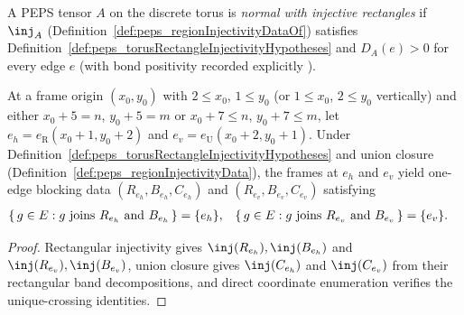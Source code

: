 \begin{definition}%
    \label{def:peps_normalTorusRectanglePEPS}
    \leanok
    A PEPS tensor $A$ on the discrete torus is \emph{normal with injective
        rectangles} if $\inj_A$ (Definition~\ref{def:peps_regionInjectivityDataOf})
    satisfies Definition~\ref{def:peps_torusRectangleInjectivityHypotheses} and
    $D_A(e)>0$ for every edge $e$ \cite[Theorem~3]{Molnar2018NormalPEPS}
    (with bond positivity recorded explicitly
    \cite{gap:peps_injective_ft_section3_route}).
\end{definition}

\begin{lemma}%
    \label{lem:peps_torusRectangleReferenceBlockingData}
    \leanok
    At a frame origin $(x_0,y_0)$ with $2\le x_0$, $1\le y_0$ (or $1\le x_0$,
    $2\le y_0$ vertically) and either $x_0+5=n$, $y_0+5=m$ or $x_0+7\le n$,
    $y_0+7\le m$, let $e_h=e_{\mathrm R}(x_0+1,y_0+2)$ and
    $e_v=e_{\mathrm U}(x_0+2,y_0+1)$. Under
    Definition~\ref{def:peps_torusRectangleInjectivityHypotheses} and union
    closure (Definition~\ref{def:peps_regionInjectivityData}), the frames at
    $e_h$ and $e_v$ yield one-edge blocking data $(R_{e_h},B_{e_h},C_{e_h})$
    and $(R_{e_v},B_{e_v},C_{e_v})$ satisfying
    \begin{align}
        \{\,g\in E:g\text{ joins }R_{e_h}\text{ and }B_{e_h}\,\}
         & =\{e_h\},
         &
        \{\,g\in E:g\text{ joins }R_{e_v}\text{ and }B_{e_v}\,\}
         & =\{e_v\}.
        \notag
    \end{align}
\end{lemma}
\begin{proof}
    \leanok
    Rectangular injectivity gives $\inj(R_{e_h}),\inj(B_{e_h})$ and
    $\inj(R_{e_v}),\inj(B_{e_v})$, union closure gives $\inj(C_{e_h})$ and
    $\inj(C_{e_v})$ from their rectangular band decompositions, and direct
    coordinate enumeration verifies the unique-crossing identities.
\end{proof}

